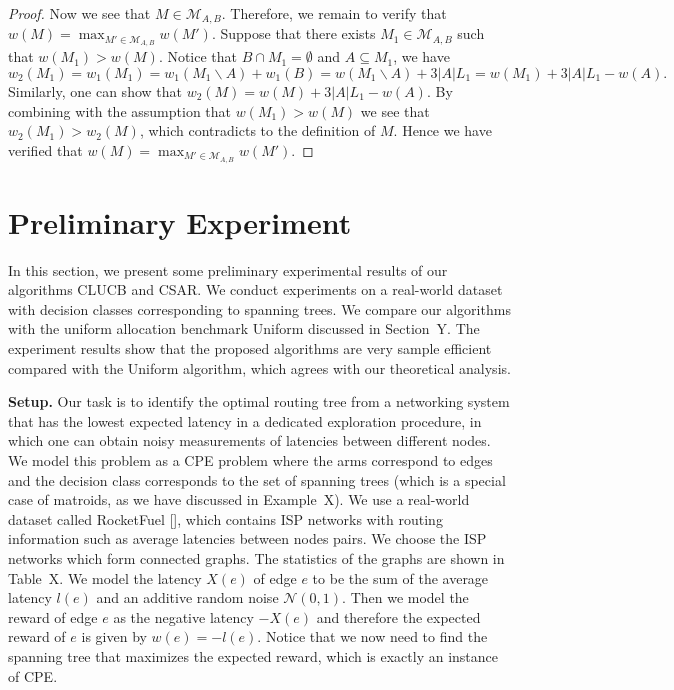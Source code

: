 \documentclass{article}
\newcommand{\Algorithm}{{\small \textsf{CLUCB}}\xspace}
\newcommand{\AlgorithmBud}{{\small \textsf{CSAR}}\xspace}
\newcommand{\Uniform}{{\small \textsf{Uniform}}\xspace}
\newcommand{\Problem}{{CPE}\xspace}
\newcommand{\M}{\mathcal M}
\newcommand{\del}{\backslash}
\begin{document}
\begin{proof}
Now we see that $M\in \M_{A,B}$. 
Therefore, we remain to verify that $w(M) = \max_{M'\in\M_{A,B}} w(M')$.
Suppose that there exists $M_1\in \M_{A,B}$ such that $w(M_1) > w(M)$.
Notice that $B\cap M_1=\emptyset$ and $A\subseteq M_1$, we have
$$
w_2(M_1) = w_1(M_1) = w_1(M_1\del A)+w_1(B) = w(M_1\del A)+3|A|L_1 = w(M_1)+3|A|L_1-w(A).
$$
Similarly, one can show that $w_2(M) = w(M)+3|A|L_1-w(A)$.
By combining with the assumption that $w(M_1) > w(M)$
we see that $w_2(M_1) > w_2(M)$, which contradicts to the definition of $M$. 
Hence we have verified that $w(M) = \max_{M'\in\M_{A,B}} w(M')$.
\end{proof}

\section{Preliminary Experiment}
In this section, we present some preliminary experimental results of our algorithms \Algorithm and \AlgorithmBud. 
We conduct experiments on a real-world dataset with decision classes corresponding to spanning trees.
We compare our algorithms with the uniform allocation benchmark \Uniform discussed in Section~Y.
The experiment results show that the proposed algorithms are very sample efficient compared with the \Uniform algorithm, which agrees with our theoretical analysis.



\textbf{Setup.} 
Our task is to identify the optimal routing tree from a networking system that has the lowest expected latency in a dedicated exploration procedure, in which one can obtain noisy measurements of latencies between different nodes.
We model this problem as a \Problem problem where the arms correspond to edges and the decision class corresponds to the set of spanning trees (which is a special case of matroids, as we have discussed in Example~X).
We use a real-world dataset called RocketFuel [], which contains  ISP networks with routing information such as average latencies between nodes pairs. 
We choose the ISP networks which form connected graphs.
The statistics of the graphs are shown in Table~X.
We model the latency $X(e)$ of edge $e$ to be the sum of the average latency $l(e)$ and an additive random noise $\mathcal N(0, 1)$.
Then we model the reward of edge $e$ as the negative latency $-X(e)$ and therefore the expected reward of $e$ is given by $w(e) = -l(e)$.
Notice that we now need to find the spanning tree that maximizes the expected reward, which is exactly an instance of \Problem. 
\end{document}
